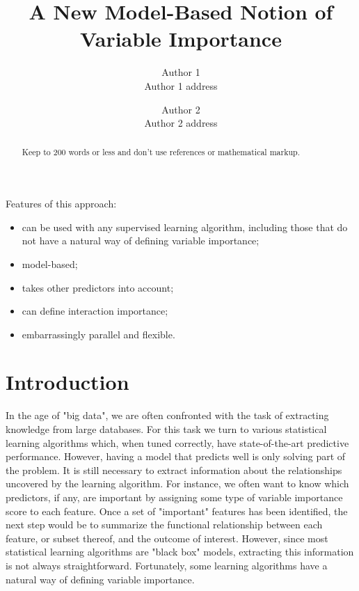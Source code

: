 \documentclass{article}
\title{A New Model-Based Notion of Variable Importance}
\date{}
\author{Author 1\\ Author 1 address \and Author 2\\Author 2 address}
\begin{document}
\maketitle


\begin{abstract}
Keep to 200 words or less and don't use references or mathematical markup.
\end{abstract}


Features of this approach:
\begin{itemize}
  \item can be used with any supervised learning algorithm, including those that do not have a natural way of defining variable importance;
  \item model-based;
  \item takes other predictors into account;
  \item can define interaction importance;
  \item embarrassingly parallel and flexible.
\end{itemize}


\section{Introduction}

In the age of "big data", we are often confronted with the task of extracting knowledge from large databases. For this task we turn to various statistical learning algorithms which, when tuned correctly, have state-of-the-art predictive performance. However, having a model that predicts well is only solving part of the problem. It is still necessary to extract information about the relationships uncovered by the learning algorithm. For instance, we often want to know which predictors, if any, are important by assigning some type of variable importance score to each feature. Once a set of "important" features has been identified, the next step would be to summarize the functional relationship between each feature, or subset thereof, and the outcome of interest. However, since most statistical learning algorithms are "black box" models, extracting this information is not always straightforward. Fortunately, some learning algorithms have a natural way of defining variable importance.
\end{document}
